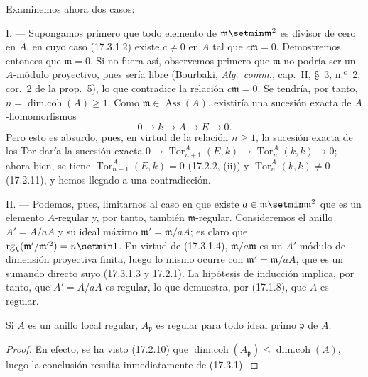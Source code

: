 Examinemos ahora dos casos:

\medskip\noindent I. --- Supongamos primero que todo elemento de
$\mathfrak m\setmin\mathfrak{m}^2$ es divisor de cero en $A$, en cuyo caso
(17.3.1.2) existe $c\neq0$ en $A$ tal que $c\mathfrak{m}=0$. Demostremos
entonces que $\mathfrak{m}=0$. Si no fuera así, observemos primero que
$\mathfrak{m}$ no podría ser un $A$-módulo proyectivo, pues sería libre
(Bourbaki, \emph{Alg.~comm.}, cap.~II, \S~3, n.º~2, cor.~2 de la prop.~5),
lo que contradice la relación $c\mathfrak{m}=0$. Se tendría, por tanto,
$n=\operatorname{dim.coh}(A)\geq1$. Como
$\mathfrak{m}\in\operatorname{Ass}(A)$, existiría una sucesión exacta de
$A$-homomorfismos
\[
  0\longrightarrow k\longrightarrow A\longrightarrow E\longrightarrow0.
\]
Pero esto es absurdo, pues, en virtud de la relación $n\geq1$, la sucesión
exacta de los Tor daría la sucesión exacta
$0\longrightarrow\operatorname{Tor}^A_{n+1}(E,k)\longrightarrow
\operatorname{Tor}^A_n(k,k)\longrightarrow0$; ahora bien, se tiene
$\operatorname{Tor}^A_{n+1}(E,k)=0$ (17.2.2, (ii)) y
$\operatorname{Tor}^A_n(k,k)\neq0$ (17.2.11), y hemos llegado a una
contradicción.

\medskip\noindent II. --- Podemos, pues, limitarnos al caso en que
existe $a\in\mathfrak m\setmin\mathfrak{m}^2$ que es un elemento $A$-regular y, por
tanto, también $\mathfrak{m}$-regular. Consideremos el anillo $A'=A/aA$ y su
ideal
máximo $\mathfrak{m}'=\mathfrak{m}/aA$; es claro que
$\operatorname{rg}_k(\mathfrak{m}'/\mathfrak{m}'^2)=n\setmin 1$. En virtud de
(17.3.1.4), $\mathfrak{m}/a\mathfrak{m}$ es un $A'$-módulo de dimensión
proyectiva finita, luego lo mismo ocurre con
$\mathfrak{m}'=\mathfrak{m}/aA$, que es un sumando directo suyo (17.3.1.3 y
17.2.1). La hipótesis de inducción implica, por tanto, que $A'=A/aA$ es
regular, lo que demuestra, por (17.1.8), que $A$ es regular.

\begin{corollary}[17.3.2]
\label{0.17.3.2-es}
Si $A$ es un anillo local regular, $A_{\mathfrak{p}}$ es regular para todo
ideal primo $\mathfrak{p}$ de $A$.
\end{corollary}

\begin{proof}
En efecto, se ha visto (17.2.10) que
$\operatorname{dim.coh}(A_{\mathfrak{p}})\leq
\operatorname{dim.coh}(A)$, luego la conclusión resulta inmediatamente de
(17.3.1).
\end{proof}

